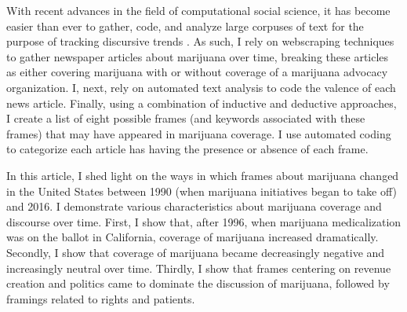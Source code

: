 

With recent advances in the field of computational social science, it has become easier than ever to gather, code, and analyze large corpuses of text for the purpose of tracking discursive trends \citep{bateman_et_al_2019,bail_2012,vasi_et_al_2015}. As such, I rely on webscraping techniques to gather newspaper articles about marijuana over time, breaking these articles as either covering marijuana with or without coverage of a marijuana advocacy organization. I, next, rely on automated text analysis to code the valence of each news article. Finally, using a combination of inductive and deductive approaches, I create a list of eight possible frames (and keywords associated with these frames) that may have appeared in marijuana coverage. I use automated coding to categorize each article has having the presence or absence of each frame. 


In this article, I shed light on the ways in which frames about marijuana changed in the United States between 1990 (when marijuana initiatives began to take off) and 2016. I demonstrate various characteristics about marijuana coverage and discourse over time. First, I show that, after 1996, when marijuana medicalization was on the ballot in California, coverage of marijuana increased dramatically. Secondly, I show that coverage of marijuana became decreasingly negative and increasingly neutral over time. Thirdly, I show that frames centering on revenue creation and politics came to dominate the discussion of marijuana, followed by framings related to rights and patients. 


